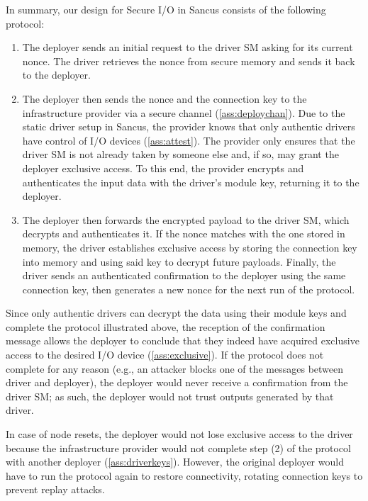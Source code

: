 In summary, our design for Secure I/O in Sancus consists of the following
protocol:
%
\begin{enumerate}
  \item The deployer sends an initial request to the driver \ac{SM} asking for
    its current nonce. The driver retrieves the nonce from secure memory and
    sends it back to the deployer.
  \item The deployer then sends the nonce and the connection key to the
    infrastructure provider via a secure channel (\ref{ass:deploychan}). Due to
    the static driver setup in Sancus, the provider knows that only authentic
    drivers have control of I/O devices (\ref{ass:attest}). The provider only
    ensures that the driver \ac{SM} is not already taken by someone else and, if
    so, may grant the deployer exclusive access. To this end, the provider
    encrypts and authenticates the input data with the driver's module key,
    returning it to the deployer.
  \item The deployer then forwards the encrypted payload to the driver \ac{SM},
    which decrypts and authenticates it. If the nonce matches with the one
    stored in memory, the driver establishes exclusive access by storing the
    connection key into memory and using said key to decrypt future
    payloads. Finally, the driver sends an authenticated confirmation to the
    deployer using the same connection key, then generates a new nonce for the
    next run of the protocol.
\end{enumerate}
%

Since only authentic drivers can decrypt the data using their module keys and
complete the protocol illustrated above, the reception of the confirmation
message allows the deployer to conclude that they indeed have acquired exclusive
access to the desired I/O device (\ref{ass:exclusive}).  If the protocol does
not complete for any reason (e.g., an attacker blocks one of the messages
between driver and deployer), the deployer would never receive a confirmation
from the driver \ac{SM}; as such, the deployer would not trust outputs generated
by that driver.

In case of node resets, the deployer would not lose exclusive access to the
driver because the infrastructure provider would not complete step (2) of the
protocol with another deployer (\ref{ass:driverkeys}). However, the original
deployer would have to run the protocol again to restore connectivity, rotating
connection keys to prevent replay attacks.  


